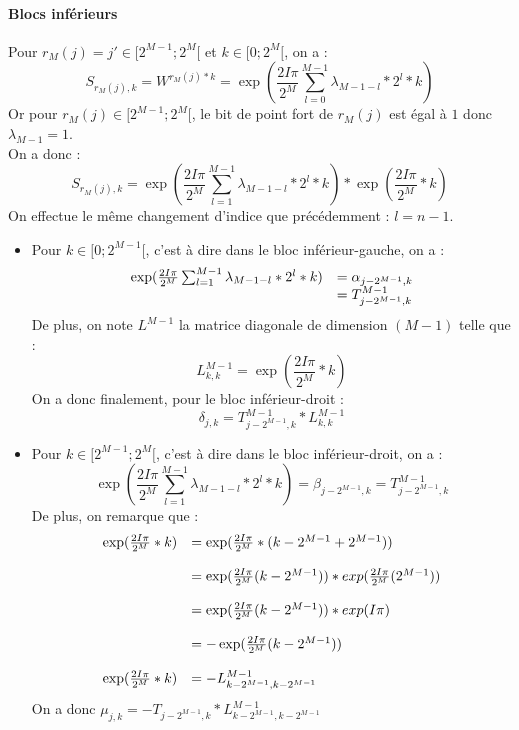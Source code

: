 \documentclass{report}
\begin{document}
			\paragraph{Blocs inférieurs}
			Pour $r_M(j) = j' \in [2^{M-1}; 2^M[$ et $k\in[0; 2^M[$, on a :
			\[
				S_{r_M(j),k} = W^{r_M(j)*k} = \exp({\frac{2I\pi}{2^M}} \sum_{l=0}^{M-1} \lambda_{M-1-l} * 2^{l} * k)
			\]
			Or pour $r_M(j)\in[2^{M-1}; 2^M[$, le bit de point fort de $r_M(j)$ est égal à $1$ donc $\lambda_{M-1} = 1$.\\
			On a donc :
			\[
				S_{r_M(j),k} = \exp({\frac{2I\pi}{2^M}} \sum_{l=1}^{M-1} \lambda_{M-1-l} * 2^l * k) * \exp(\frac{2I\pi}{2^M} * k)
			\]
			On effectue le même changement d'indice que précédemment : $l = n-1$.
			\begin{itemize}
				\item Pour $k\in[0; 2^{M-1}[$, c'est à dire dans le bloc inférieur-gauche, on a :\\
				\[
				\begin{array}{l l}
					\exp({\frac{2I\pi}{2^M}} \sum_{l=1}^{M-1} \lambda_{M-1-l} * 2^{l} * k)
						&= \alpha_{j-2^{M-1},k} \\
						&= T_{j-2^{M-1},k}^{M-1}
				\end{array}
				\]
				De plus, on note $L^{M-1}$ la matrice diagonale de dimension $(M-1)$ telle que :
				\[
					L_{k,k}^{M-1} = \exp({\frac{2I\pi}{2^M}} * k)
				\]
				On a donc finalement, pour le bloc inférieur-droit :
				\[
					\boxed{\delta_{j,k} = T_{j-2^{M-1},k}^{M-1} * L_{k,k}^{M-1}}
				\]


				\item Pour $k\in[2^{M-1}; 2^M[$, c'est à dire dans le bloc inférieur-droit, on a :
				\[
					\exp({\frac{2I\pi}{2^M}} \sum_{l=1}^{M-1} \lambda_{M-1-l} * 2^{l} * k)
						= \beta_{j-2^{M-1},k}
						= T_{j-2^{M-1},k}^{M-1}
				\]
				De plus, on remarque que :
				\[
				\begin{array}{r l}
					\exp({\frac{2I\pi}{2^M}}*k)
						& =	\exp({\frac{2I\pi}{2^M}}*(k-2^{M-1}+2^{M-1})) \\
						&	\\

					 	& =	\exp({\frac{2I\pi}{2^M}}(k-2^{M-1})) * exp({\frac{2I\pi}{2^M}}(2^{M-1})) \\
						&	\\

					 	& =	\exp({\frac{2I\pi}{2^M}}(k-2^{M-1})) * exp(I\pi) \\
						&	\\

					 	& = -\exp({\frac{2I\pi}{2^M}}(k-2^{M-1})) \\
						&	\\
					\exp({\frac{2I\pi}{2^M}}*k)
						& =	-L_{k-2^{M-1},k-2^{M-1}}^{M-1}
				\end{array}
				\]
				On a donc $\boxed{\mu_{j,k} = -T_{j-2^{M-1},k} * L_{k-2^{M-1},k-2^{M-1}}^{M-1} }$
			\end{itemize}
\end{document}
